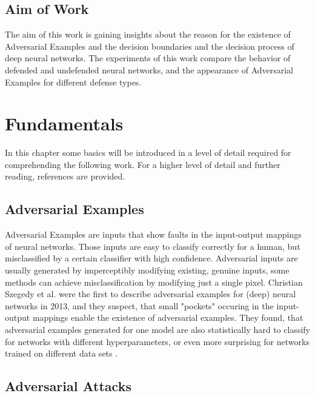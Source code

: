 \documentclass[draft,final]{vutinfth} %
\begin{document}
\section{Aim of Work}

The aim of this work is gaining insights about the reason for the existence of Adversarial Examples and the decision boundaries and the decision process of deep neural networks.
The experiments of this work compare the behavior of defended and undefended neural networks, and the appearance of Adversarial Examples for different defense types.

\chapter{Fundamentals}

In this chapter some basics will be introduced in a level of detail required for comprehending the following work.
For a higher level of detail and further reading, references are provided.

\section{Adversarial Examples}

Adversarial Examples are inputs that show faults in the input-output mappings of neural networks.
Those inputs are easy to classify correctly for a human, but misclassified by a certain classifier with high confidence.
Adversarial inputs are usually generated by imperceptibly modifying existing, genuine inputs, some methods can achieve misclassification by modifying just a single pixel\cite{Jiawei2017}.
Christian Szegedy et al. were the first to describe adversarial examples for (deep) neural networks in 2013, and they suspect, that small "pockets" occuring in the input-output mappings enable the existence of adversarial examples.
They found, that adversarial examples generated for one model are also statistically hard to classify for networks with different hyperparameters, or even more surprising for networks trained on different data sets \cite{Szegedy2013}.

\section{Adversarial Attacks}
\label{section:adv_att}
\end{document}
